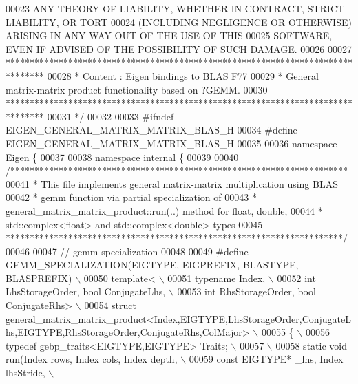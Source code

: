 \begin{DoxyCode}
00023 \textcolor{comment}{ ANY THEORY OF LIABILITY, WHETHER IN CONTRACT, STRICT LIABILITY, OR TORT}
00024 \textcolor{comment}{ (INCLUDING NEGLIGENCE OR OTHERWISE) ARISING IN ANY WAY OUT OF THE USE OF THIS}
00025 \textcolor{comment}{ SOFTWARE, EVEN IF ADVISED OF THE POSSIBILITY OF SUCH DAMAGE.}
00026 \textcolor{comment}{}
00027 \textcolor{comment}{ ********************************************************************************}
00028 \textcolor{comment}{ *   Content : Eigen bindings to BLAS F77}
00029 \textcolor{comment}{ *   General matrix-matrix product functionality based on ?GEMM.}
00030 \textcolor{comment}{ ********************************************************************************}
00031 \textcolor{comment}{*/}
00032 
00033 \textcolor{preprocessor}{#ifndef EIGEN\_GENERAL\_MATRIX\_MATRIX\_BLAS\_H}
00034 \textcolor{preprocessor}{#define EIGEN\_GENERAL\_MATRIX\_MATRIX\_BLAS\_H}
00035 
00036 \textcolor{keyword}{namespace }\hyperlink{namespace_eigen}{Eigen} \{ 
00037 
00038 \textcolor{keyword}{namespace }\hyperlink{namespaceinternal}{internal} \{
00039 
00040 \textcolor{comment}{/**********************************************************************}
00041 \textcolor{comment}{* This file implements general matrix-matrix multiplication using BLAS}
00042 \textcolor{comment}{* gemm function via partial specialization of}
00043 \textcolor{comment}{* general\_matrix\_matrix\_product::run(..) method for float, double,}
00044 \textcolor{comment}{* std::complex<float> and std::complex<double> types}
00045 \textcolor{comment}{**********************************************************************/}
00046 
00047 \textcolor{comment}{// gemm specialization}
00048 
00049 \textcolor{preprocessor}{#define GEMM\_SPECIALIZATION(EIGTYPE, EIGPREFIX, BLASTYPE, BLASPREFIX) \(\backslash\)}
00050 \textcolor{preprocessor}{template< \(\backslash\)}
00051 \textcolor{preprocessor}{  typename Index, \(\backslash\)}
00052 \textcolor{preprocessor}{  int LhsStorageOrder, bool ConjugateLhs, \(\backslash\)}
00053 \textcolor{preprocessor}{  int RhsStorageOrder, bool ConjugateRhs> \(\backslash\)}
00054 \textcolor{preprocessor}{struct
       general\_matrix\_matrix\_product<Index,EIGTYPE,LhsStorageOrder,ConjugateLhs,EIGTYPE,RhsStorageOrder,ConjugateRhs,ColMajor> \(\backslash\)}
00055 \textcolor{preprocessor}{\{ \(\backslash\)}
00056 \textcolor{preprocessor}{typedef gebp\_traits<EIGTYPE,EIGTYPE> Traits; \(\backslash\)}
00057 \textcolor{preprocessor}{\(\backslash\)}
00058 \textcolor{preprocessor}{static void run(Index rows, Index cols, Index depth, \(\backslash\)}
00059 \textcolor{preprocessor}{  const EIGTYPE* \_lhs, Index lhsStride, \(\backslash\)}

\end{DoxyCode}
